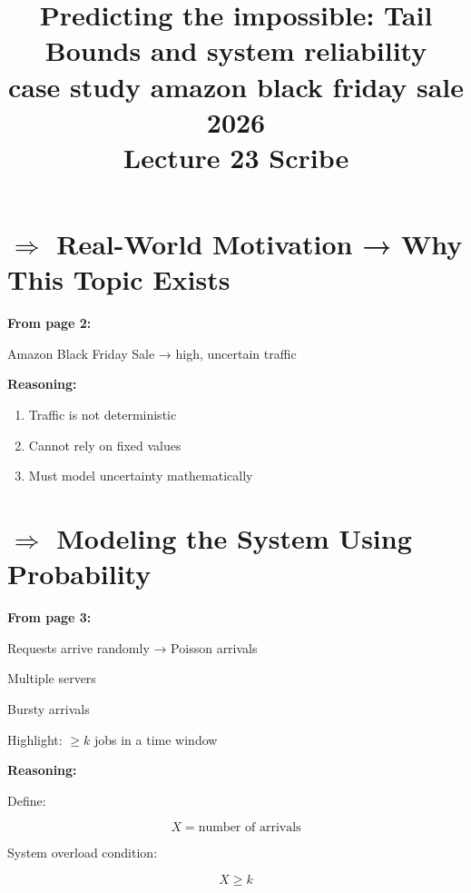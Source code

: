 \documentclass{article}
\title{Predicting the impossible: Tail Bounds and system reliability \\ case study amazon black friday sale 2026 \\ Lecture 23 Scribe}
\date{}
\begin{document}
\maketitle


\section*{$\Rightarrow$ Real-World Motivation → Why This Topic Exists}

\textbf{From page 2:}

Amazon Black Friday Sale → high, uncertain traffic

\vspace{0.2cm}

\textbf{Reasoning:}

\begin{enumerate}
\item Traffic is not deterministic
\item Cannot rely on fixed values
\item Must model uncertainty mathematically
\end{enumerate}

\vspace{0.6cm}


\section*{$\Rightarrow$ Modeling the System Using Probability}

\textbf{From page 3:}

Requests arrive randomly → Poisson arrivals  

Multiple servers  

Bursty arrivals  

Highlight: $\ge k$ jobs in a time window  

\vspace{0.2cm}

\textbf{Reasoning:}

Define:

\[
X = \text{number of arrivals}
\]

System overload condition:

\[
X \ge k
\]

\vspace{0.6cm}

\end{document}
